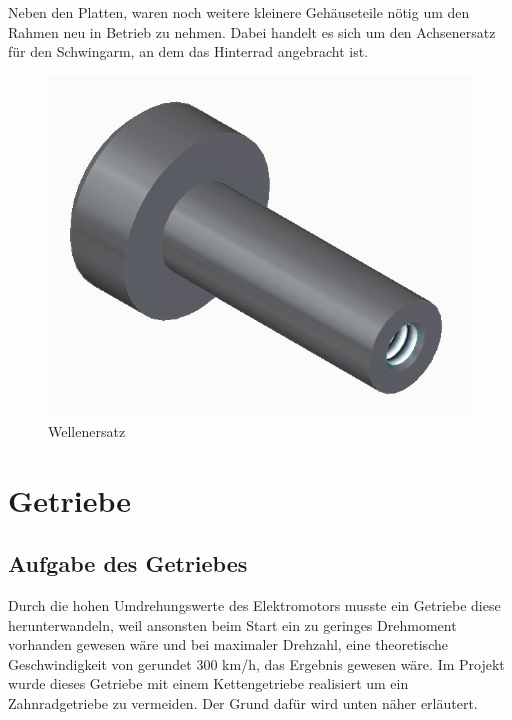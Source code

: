 Neben den Platten, waren noch weitere kleinere Gehäuseteile nötig um den Rahmen neu in Betrieb zu nehmen. Dabei handelt es sich um den Achsenersatz für den Schwingarm, an dem das Hinterrad angebracht ist. 

\begin{figure} [H]
	\begin{center}
		\includegraphics[scale=0.2]{figures/mechanik/Welle_Rechts.jpg}
			\caption{Wellenersatz}
			\label{fig:Wellenersatz}
	\end{center}
\end{figure}

\newpage

\section{Getriebe}

\subsection{Aufgabe des Getriebes}

Durch die hohen Umdrehungswerte des Elektromotors musste ein Getriebe diese herunterwandeln, weil ansonsten beim Start ein zu geringes Drehmoment vorhanden gewesen wäre und bei maximaler Drehzahl, eine theoretische Geschwindigkeit von gerundet 300 km/h, das Ergebnis gewesen wäre. Im Projekt wurde dieses Getriebe mit einem Kettengetriebe realisiert um ein Zahnradgetriebe zu vermeiden. Der Grund dafür wird unten näher erläutert.

